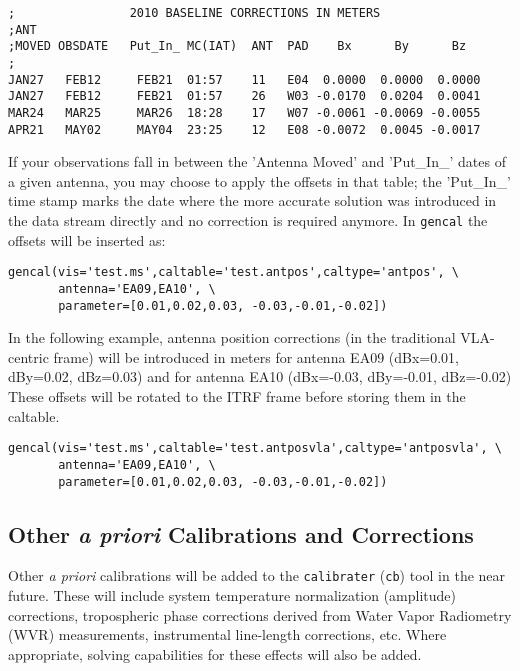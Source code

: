 \begin{verbatim}
;                2010 BASELINE CORRECTIONS IN METERS
;ANT
;MOVED OBSDATE   Put_In_ MC(IAT)  ANT  PAD    Bx      By      Bz
;
JAN27   FEB12     FEB21  01:57    11   E04  0.0000  0.0000  0.0000
JAN27   FEB12     FEB21  01:57    26   W03 -0.0170  0.0204  0.0041
MAR24   MAR25     MAR26  18:28    17   W07 -0.0061 -0.0069 -0.0055
APR21   MAY02     MAY04  23:25    12   E08 -0.0072  0.0045 -0.0017
\end{verbatim}


If your observations fall in between the 'Antenna Moved' and
'Put\_In\_' dates of a given antenna, you may choose to apply the
offsets in that table; the 'Put\_In\_' time stamp marks the date where
the more accurate solution was introduced in the data stream directly
and no correction is required anymore. In {\tt gencal} the offsets
will be inserted as:



\small
\begin{verbatim}
gencal(vis='test.ms',caltable='test.antpos',caltype='antpos', \
       antenna='EA09,EA10', \
       parameter=[0.01,0.02,0.03, -0.03,-0.01,-0.02])
\end{verbatim}
\normalsize


In the following example, antenna position corrections (in the
traditional VLA-centric frame) will be introduced in meters for
antenna EA09 (dBx=0.01, dBy=0.02, dBz=0.03) and for antenna EA10
(dBx=-0.03, dBy=-0.01, dBz=-0.02) These offsets will be rotated to the
ITRF frame before storing them in the caltable.

\small
\begin{verbatim}
gencal(vis='test.ms',caltable='test.antposvla',caltype='antposvla', \
       antenna='EA09,EA10', \
       parameter=[0.01,0.02,0.03, -0.03,-0.01,-0.02])
\end{verbatim}
\normalsize



\subsection{Other {\it a priori} Calibrations and Corrections}
\label{section:cal.prior.other}

Other {\it a priori} calibrations will be added to the 
{\tt calibrater} ({\tt cb}) tool 
in the near future.  These will include
system temperature normalization (amplitude) corrections,
tropospheric phase corrections derived from Water Vapor Radiometry
(WVR) measurements, instrumental line-length corrections, etc.  Where
appropriate, solving capabilities for these effects will also be
added.

